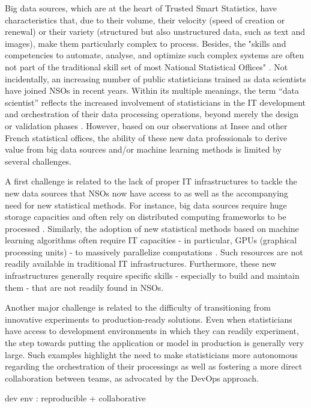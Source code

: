 Big data sources, which are at the heart of Trusted Smart Statistics, have characteristics that, due to their volume, their velocity (speed of creation or renewal) or their variety (structured but also unstructured data, such as text and images), make them particularly complex to process. Besides, the "skills and competencies to automate, analyse, and optimize such complex systems are often not part of the traditional skill set of most National Statistical Offices" \cite{ashofteh2021data}. Not incidentally, an increasing number of public statisticians trained as data scientists have joined NSOs in recent years. Within its multiple meanings, the term “data scientist” reflects the increased involvement of statisticians in the IT development and orchestration of their data processing operations, beyond merely the design or validation phases \cite{davenport2012data}. However, based on our observations at Insee and other French statistical offices, the ability of these new data professionals to derive value from big data sources and/or machine learning methods is limited by several challenges.

A first challenge is related to the lack of proper IT infrastructures to tackle the new data sources that NSOs now have access to as well as the accompanying need for new statistical methods. For instance, big data sources require huge storage capacities and often rely on distributed computing frameworks to be processed \cite{liu2013computing}. Similarly, the adoption of new statistical methods based on machine learning algorithms often require IT capacities - in particular, GPUs (graphical processing units) - to massively parallelize computations \cite{saiyeda2017cloud}. Such resources are not readily available in traditional IT infrastructures. Furthermore, these new infrastructures generally require specific skills - especially to build and maintain them - that are not readily found in NSOs.

Another major challenge is related to the difficulty of transitioning from innovative experiments to production-ready solutions. Even when statisticians have access to development environments in which they can readily experiment, the step towards putting the application or model in production is generally very large. Such examples highlight the need to make statisticians more autonomous regarding the orchestration of their processings as well as fostering a more direct collaboration between teams, as advocated by the DevOps approach.

dev env : reproducible + collaborative

